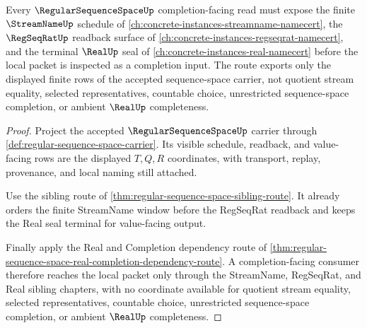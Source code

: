 \begin{proposition}
\label{thm:regular-sequence-space-regseqrat-streamname-real-route}
Every $\RegularSequenceSpaceUp$ completion-facing read must expose the finite $\StreamNameUp$ schedule of \autoref{ch:concrete-instances-streamname-namecert}, the $\RegSeqRatUp$ readback surface of \autoref{ch:concrete-instances-regseqrat-namecert}, and the terminal $\RealUp$ seal of \autoref{ch:concrete-instances-real-namecert} before the local packet is inspected as a completion input. The route exports only the displayed finite rows of the accepted sequence-space carrier, not quotient stream equality, selected representatives, countable choice, unrestricted sequence-space completion, or ambient $\RealUp$ completeness.
\end{proposition}
\begin{proof}
Project the accepted $\RegularSequenceSpaceUp$ carrier through \autoref{def:regular-sequence-space-carrier}. Its visible schedule, readback, and value-facing rows are the displayed $T,Q,R$ coordinates, with transport, replay, provenance, and local naming still attached.

Use the sibling route of \autoref{thm:regular-sequence-space-sibling-route}. It already orders the finite StreamName window before the RegSeqRat readback and keeps the Real seal terminal for value-facing output.

Finally apply the Real and Completion dependency route of \autoref{thm:regular-sequence-space-real-completion-dependency-route}. A completion-facing consumer therefore reaches the local packet only through the StreamName, RegSeqRat, and Real sibling chapters, with no coordinate available for quotient stream equality, selected representatives, countable choice, unrestricted sequence-space completion, or ambient $\RealUp$ completeness.
\end{proof}
